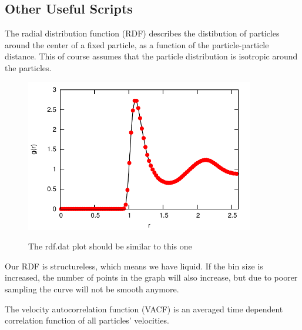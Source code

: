 \documentclass[
paper=a4,                       %
fontsize=11pt,                  %
twoside,                        %
footsepline,                    %
headsepline,                    %
headinclude=false,              %
footinclude=false,              %
pagesize,                       %
]{scrartcl}
\newtheorem{task}{Task}
\begin{document}
\subsection{Other Useful Scripts}
The radial distribution function (RDF) describes the distibution of particles around
the center of a fixed particle, as a function of the particle-particle distance. This of course assumes
that the particle distribution is isotropic around the particles.

\vspace{1cm}\vspace{1cm}

\begin{figure}[ht]
\begin{center}
\includegraphics[width=10cm]{figures/rdf}
\label{fig:rdf}
\caption{The rdf.dat plot should be similar to this one}
\end{center}
\end{figure}

\noindent Our RDF is structureless, which means we have liquid. If the bin size is increased, the number of points in the
graph will also increase, but due to poorer sampling the curve will not be smooth anymore. 

\newpage

The velocity autocorrelation function (VACF) is an averaged time dependent correlation function of all particles' 
velocities. 
\end{document}
